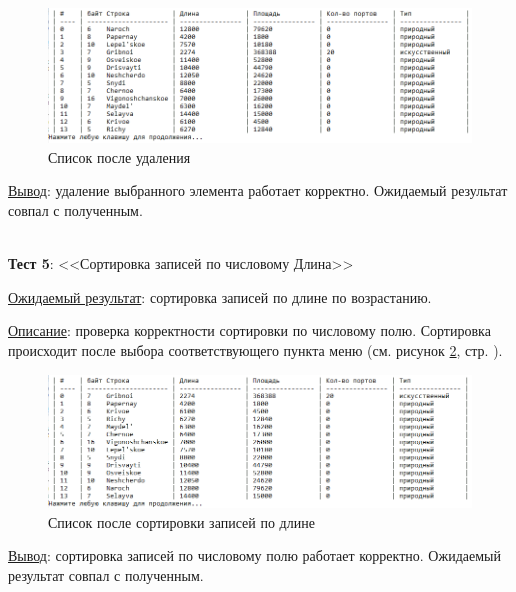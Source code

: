 
\begin{figure}[!hp]
    \begin{center}
        \includegraphics[width=16cm]{../includes_PZ/tests/data-tsv-4.png}
    \end{center}
    \caption{Список после удаления\label{fig:data_tsv_4}}
\end{figure}

\underline{Вывод}: удаление выбранного элемента работает корректно. Ожидаемый результат совпал с полученным.

\hspace{0pt}\\



\textbf{Тест 5}: <<Сортировка записей по числовому Длина>>

\underline{Ожидаемый результат}: сортировка записей по длине по возрастанию.

\underline{Описание}: проверка корректности сортировки по числовому полю. Сортировка происходит после выбора соответствующего пункта меню (см. рисунок \ref{fig:data_tsv_5}, стр. \pageref{fig:data_tsv_5}).


\begin{figure}[!hp]
    \begin{center}
        \includegraphics[width=16cm]{../includes_PZ/tests/data-tsv-5.png}
    \end{center}
    \caption{Список после сортировки записей по длине\label{fig:data_tsv_5}}
\end{figure}

\underline{Вывод}: сортировка записей по числовому полю работает корректно. Ожидаемый результат совпал с полученным.